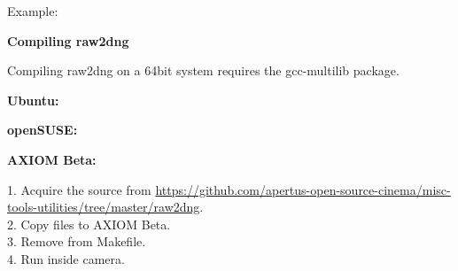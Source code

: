                       
Example:                       


\textbf{Compiling raw2dng}

Compiling raw2dng on a 64bit system requires the gcc-multilib package.

\textbf{Ubuntu:} 

    
    
\textbf{openSUSE:}

    
    
\textbf{AXIOM Beta:}

1. Acquire the source from \href{https://github.com/apertus-open-source-cinema/misc-tools-utilities/tree/master/raw2dng}{https://github.com/apertus-open-source-cinema/misc-tools-utilities/tree/master/raw2dng}.\\
2. Copy files to AXIOM Beta.\\
3. Remove  from Makefile.\\
4. Run  inside camera.\\                     
                      

